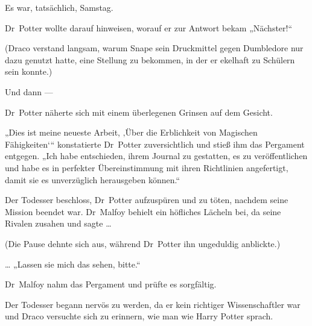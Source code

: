 Es war, tatsächlich, Samstag.

Dr~Potter wollte darauf hinweisen, worauf er zur Antwort bekam
„Nächster!“

(Draco verstand langsam, warum Snape sein Druckmittel gegen Dumbledore nur dazu genutzt hatte, eine Stellung zu bekommen, in der er ekelhaft zu Schülern sein konnte.)

Und dann —

Dr~Potter näherte sich mit einem überlegenen Grinsen auf dem Gesicht.

„Dies ist meine neueste Arbeit, ‚Über die Erblichkeit von Magischen Fähigkeiten‘“ konstatierte Dr~Potter zuversichtlich und stieß ihm das Pergament entgegen.
„Ich habe entschieden, ihrem Journal zu gestatten, es zu veröffentlichen und habe es in perfekter Übereinstimmung mit ihren Richtlinien angefertigt, damit sie es unverzüglich herausgeben können.“

Der Todesser beschloss, Dr~Potter aufzuspüren und zu töten, nachdem seine Mission beendet war. Dr~Malfoy behielt ein höfliches Lächeln bei, da seine Rivalen zusahen und sagte …

(Die Pause dehnte sich aus, während Dr~Potter ihn ungeduldig anblickte.)

…
„Lassen sie mich das sehen, bitte.“

Dr~Malfoy nahm das Pergament und prüfte es sorgfältig.

Der Todesser begann nervös zu werden, da er kein richtiger Wissenschaftler war und Draco versuchte sich zu erinnern, wie man wie Harry Potter sprach.

